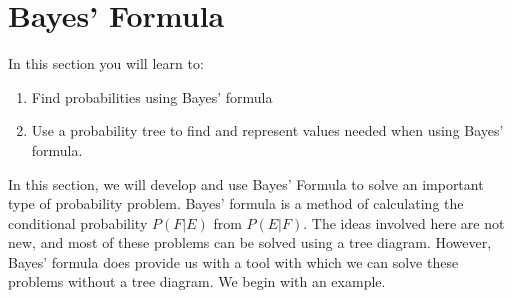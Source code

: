 \section{Bayes' Formula}
In this section you will learn to:
\begin{enumerate}
    \item Find probabilities using Bayes' formula
    \item Use a probability tree to find and represent values needed when using Bayes' formula.
\end{enumerate}
In this section, we will develop and use Bayes' Formula to solve an important type of probability problem. Bayes' formula is a method of calculating the conditional probability \( P(F | E) \) from \( P(E | F) \). The ideas involved here are not new, and most of these problems can be solved using a tree diagram. However, Bayes' formula does provide us with a tool with which we can solve these problems without a tree diagram.
We begin with an example.


